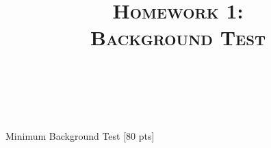 \documentclass[a4paper]{article}
\title{\textsc{Homework 1: \\ Background Test}} %
\author{
\red{Yifan Li} \\
\red{9077012806}\\
}
\date{}
\theoremstyle{definition}
\begin{document}
\maketitle 


\begin{center}
\Huge
Minimum Background Test [80 pts]
\end{center}
\end{document}
